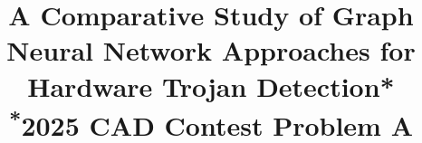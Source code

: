 \documentclass[conference]{IEEEtran}
\begin{document}

\title{A Comparative Study of Graph Neural Network Approaches for Hardware Trojan Detection*\\
{\footnotesize \textsuperscript{*}2025 CAD Contest Problem A}
}

\makeatletter %
\newcommand{\linebreakand}{%
  \end{@IEEEauthorhalign}
  \hfill\mbox{}\par
  \mbox{}\hfill\begin{@IEEEauthorhalign}
}
\makeatother %



\end{document}
